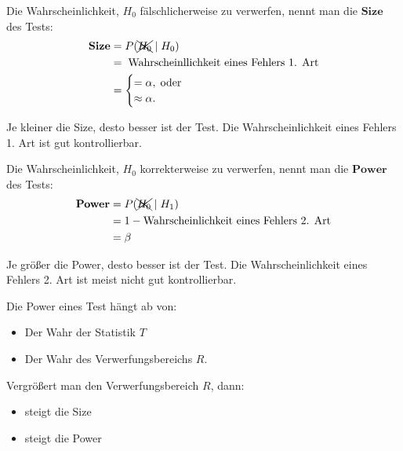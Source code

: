 \documentclass[10pt]{article}
\begin{document}
	\begin{Definition}
			Die Wahrscheinlichkeit, $H_0$ fälschlicherweise zu verwerfen, nennt man die $\textbf{Size}$ des Tests:
			\begin{equation*}
			\begin{split}
				\textbf{Size} &= P(\xcancel{H_0} \mid H_0)\\
				&= \; \text{Wahrscheinllichkeit eines Fehlers 1. Art}\\
				&= \begin{cases}
					= \alpha, \; \text{oder}\\
					\approx \alpha.
				\end{cases}
			\end{split}
		\end{equation*}
		
		Je kleiner die Size, desto besser ist der Test. Die Wahrscheinlichkeit eines Fehlers 1. Art ist gut kontrollierbar.
	\end{Definition}
	
	\begin{Definition}
		Die Wahrscheinlichkeit, $H_0$ korrekterweise zu verwerfen, nennt man die $\textbf{Power}$ des Tests:
		\begin{equation*}
			\begin{split}
				\textbf{Power} &= P(\xcancel{H_0} \mid H_1)\\
							&= 1 - \text{Wahrscheinlichkeit eines Fehlers 2. Art}\\
							&= \beta
			\end{split}
		\end{equation*}
		
		Je größer die Power, desto besser ist der Test. Die Wahrscheinlichkeit eines Fehlers 2. Art ist meist nicht gut kontrollierbar. 
		
		Die Power eines Test hängt ab von:
		\begin{itemize}
			\item Der Wahr der Statistik $T$
			\item Der Wahr des Verwerfungsbereichs $R$.
		\end{itemize}
	\end{Definition}

	\begin{Bemerkung}
		Vergrößert man den Verwerfungsbereich $R$, dann:
		\begin{itemize}
			\item steigt die Size 
			\item steigt die Power
		\end{itemize}
	\end{Bemerkung}
	
\end{document}
